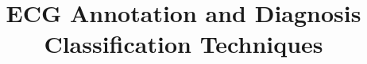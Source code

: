 \documentclass{bmcart}
\begin{document}
\begin{frontmatter}

\begin{fmbox}


\title{ECG Annotation and Diagnosis Classification Techniques}


\author[
   addressref={aff1},                   %
   corref={aff1},                       %
   email={yan.yan@siat.ac.cn}   %
]{ }
\author[
   addressref={aff1},
   email={wang.lei@siat.ac.cn}
]{ }


\address[id=aff1]{%
  , %
  ,                     %
  ,                              %
}


\end{fmbox}
\end{frontmatter}
\end{document}
